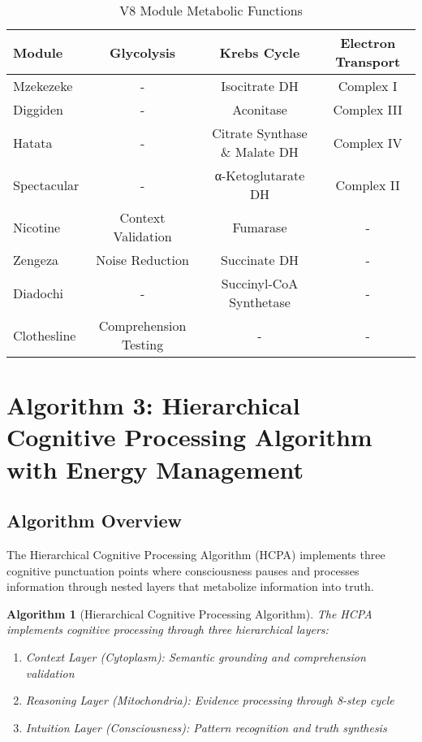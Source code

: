 \documentclass[12pt,a4paper]{article}
\newtheorem{algorithm_def}[theorem]{Algorithm}
\begin{document}
\begin{table}[htbp]
\centering
\caption{V8 Module Metabolic Functions}
\begin{tabular}{lccc}
\toprule
Module & Glycolysis & Krebs Cycle & Electron Transport \\
\midrule
Mzekezeke & - & Isocitrate DH & Complex I \\
Diggiden & - & Aconitase & Complex III \\
Hatata & - & Citrate Synthase \& Malate DH & Complex IV \\
Spectacular & - & α-Ketoglutarate DH & Complex II \\
Nicotine & Context Validation & Fumarase & - \\
Zengeza & Noise Reduction & Succinate DH & - \\
Diadochi & - & Succinyl-CoA Synthetase & - \\
Clothesline & Comprehension Testing & - & - \\
\bottomrule
\end{tabular}
\end{table}

\section{Algorithm 3: Hierarchical Cognitive Processing Algorithm with Energy Management}

\subsection{Algorithm Overview}

The Hierarchical Cognitive Processing Algorithm (HCPA) implements three cognitive punctuation points where consciousness pauses and processes information through nested layers that metabolize information into truth.

\begin{algorithm_def}[Hierarchical Cognitive Processing Algorithm]
\label{alg:hcpa}
The HCPA implements cognitive processing through three hierarchical layers:
\begin{enumerate}
    \item Context Layer (Cytoplasm): Semantic grounding and comprehension validation
    \item Reasoning Layer (Mitochondria): Evidence processing through 8-step cycle
    \item Intuition Layer (Consciousness): Pattern recognition and truth synthesis
\end{enumerate}
\end{algorithm_def}
\end{document}
